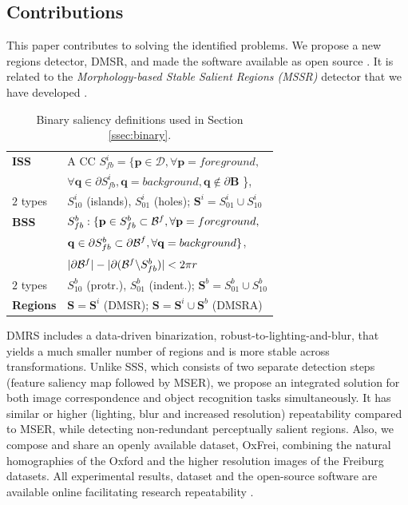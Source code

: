\documentclass[conference,compsoc]{IEEEtran}
\def\B{{\mathbf B}}
\def\mcD{{\mathcal{D}}}
\def\p{{\mathbf p}}
\def\q{{\mathbf q}}
\def\S{{\mathbf S}}
\begin{document}
\subsection{Contributions}
This paper contributes to solving the identified problems. We propose a new regions detector, DMSR, and made the software available as open source \cite{elena_ranguelova_2016_45156}. It is related to the {\em Morphology-based Stable Salient Regions (MSSR)} detector that we have developed \cite{RangMSSR06, RangHumpb06}. 
\begin{table}[hbt]
\caption{Binary saliency definitions used in Section \ref{ssec:binary}.}\label{table:binary_sal}
\begin{minipage}[b]{0.99\linewidth}\begin{tabular}{|l l|}
\hline
{\bf ISS} & A CC $S^i_{fb} = \{\p \in \mcD, \forall \p=foreground,$\\&$\forall \q \in \partial S^i_{fb}, \q=background, \q \notin \partial \B $ \},\\
$2$ types & $S^i_{10}$ (islands), $S^i_{01}$  (holes); $\S^i = S_{01}^i \cup S_{10}^i$\\
{\bf BSS} &  $S_{fb}^b: \{\p \in S_{fb}^b \subset{\cal B}^f, \forall \p = foreground,$\\&$ \q \in \partial S_{fb}^b \subset {\partial \cal B}^f,\forall \q = background \}$, \\
& $|\partial {\cal B}^f| - |\partial ({\cal B}^f \backslash S_{fb}^b)| < 2 \pi r$\\
$2$ types & $S^b_{10}$ (protr.), $S^b_{01}$ (indent.); $\S^b = S_{01}^b \cup S_{10}^b$\\
{\bf Regions} &  $\S = \S^i$ (DMSR); $\S = \S^i \cup \S^b$ (DMSRA)  \\
\hline
\end{tabular}
\centering
\end{minipage}
\end{table}


DMRS includes a data-driven binarization, robust-to-lighting-and-blur, that yields a much smaller number of regions and is more stable across transformations. Unlike SSS, which consists of two separate detection steps (feature saliency map followed by MSER), we propose an integrated solution for both image correspondence and object recognition tasks simultaneously. It has similar or higher (lighting, blur and increased resolution) repeatability compared to MSER, while detecting non-redundant perceptually salient regions. Also, we compose and share an openly available dataset, OxFrei, combining the natural homographies of the Oxford and the higher resolution images of the Freiburg datasets. All experimental results, dataset and the open-source software are available online facilitating research repeatability \cite{elena_ranguelova_2016_45156}. 
\end{document}
